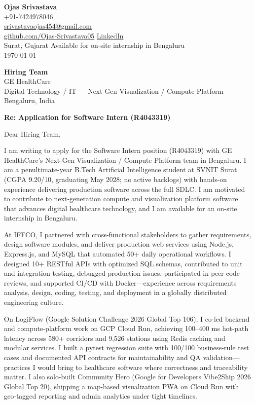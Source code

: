 \documentclass[a4paper,11pt]{article}
\begin{document}
\begin{flushright}
\textbf{Ojas Srivastava} \\
+91-7424978046 \\
\href{mailto:srivastavaojas454@gmail.com}{srivastavaojas454@gmail.com} \\
\href{https://github.com/Ojas-Srivastava05}{github.com/Ojas-Srivastava05} \textbar{}
\href{https://linkedin.com/in/ojas-srivastava05}{LinkedIn} \\
Surat, Gujarat \textbar{} Available for on-site internship in Bengaluru \\
\today
\end{flushright}

\vspace{4mm}
\textbf{Hiring Team} \\
GE HealthCare \\
Digital Technology / IT --- Next-Gen Visualization / Compute Platform \\
Bengaluru, India

\vspace{2mm}
\textbf{Re: Application for Software Intern (R4043319)}

Dear Hiring Team,

I am writing to apply for the Software Intern position (R4043319) with GE HealthCare's Next-Gen Visualization / Compute Platform team in Bengaluru. I am a penultimate-year B.Tech Artificial Intelligence student at SVNIT Surat (CGPA 9.20/10, graduating May 2028; no active backlogs) with hands-on experience delivering production software across the full SDLC. I am motivated to contribute to next-generation compute and visualization platform software that advances digital healthcare technology, and I am available for an on-site internship in Bengaluru.

At IFFCO, I partnered with cross-functional stakeholders to gather requirements, design software modules, and deliver production web services using Node.js, Express.js, and MySQL that automated 50+ daily operational workflows. I designed 10+ RESTful APIs with optimized SQL schemas, contributed to unit and integration testing, debugged production issues, participated in peer code reviews, and supported CI/CD with Docker---experience across requirements analysis, design, coding, testing, and deployment in a globally distributed engineering culture.

On LogiFlow (Google Solution Challenge 2026 Global Top 106), I co-led backend and compute-platform work on GCP Cloud Run, achieving 100--400 ms hot-path latency across 580+ corridors and 9,526 stations using Redis caching and modular services. I built a pytest regression suite with 100/100 business-rule test cases and documented API contracts for maintainability and QA validation---practices I would bring to healthcare software where correctness and traceability matter. I also solo-built Community Hero (Google for Developers Vibe2Ship 2026 Global Top 20), shipping a map-based visualization PWA on Cloud Run with geo-tagged reporting and admin analytics under tight timelines.
\end{document}
